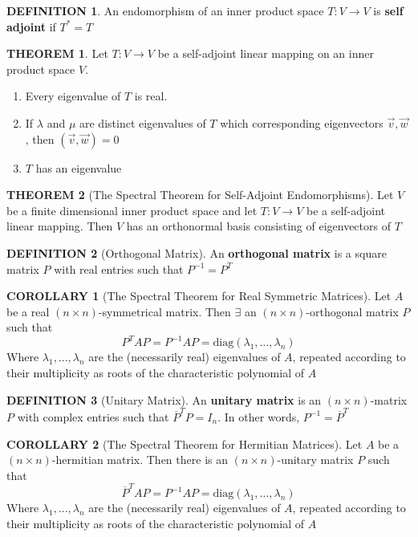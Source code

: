 \documentclass[10pt]{article}
\theoremstyle{definition}
\newtheorem{definition}{DEFINITION}[subsection]
\newtheorem{theorem}{THEOREM}[subsection]
\newtheorem{corollary}{COROLLARY}[subsection]
\begin{document}
\begin{definition}
    An endomorphism of an inner product space $T:V \rightarrow V$ is \textbf{self adjoint} if $T^* = T$
\end{definition}

\begin{theorem}
    Let $T:V \rightarrow V$ be a self-adjoint linear mapping on an inner product space $V$.
    \begin{enumerate}
        \item Every eigenvalue of $T$ is real.
        \item If $\lambda$ and $\mu$ are distinct eigenvalues of $T$ which corresponding eigenvectors $\vec{v}, \vec{w}$, then $(\vec{v}, \vec{w}) = 0$
        \item $T$ has an eigenvalue
    \end{enumerate}
\end{theorem}

\begin{theorem}[The Spectral Theorem for Self-Adjoint Endomorphisms]
    Let $V$ be a finite dimensional inner product space and let $T:V \rightarrow V$ be a self-adjoint linear mapping. Then $V$ has an orthonormal basis consisting of eigenvectors of $T$
\end{theorem}

\begin{definition}[Orthogonal Matrix]
    An \textbf{orthogonal matrix} is a square matrix $P$ with real entries such that $P^{-1} = P^T$ 
\end{definition}

\begin{corollary}[The Spectral Theorem for Real Symmetric Matrices]
    Let $A$ be a real $(n \times n)$-symmetrical matrix. Then $\exists$ an $(n \times n)$-orthogonal matrix $P$ such that
    $$P^TAP = P^{-1}AP = \text{diag}(\lambda_1,..., \lambda_n)$$
    Where $\lambda_1, ..., \lambda_n$ are the (necessarily real) eigenvalues of $A$, repeated according to their multiplicity as roots of the characteristic polynomial of $A$
\end{corollary}

\begin{definition}[Unitary Matrix]
    An \textbf{unitary matrix} is an $(n \times n)$-matrix $P$ with complex entries such that $\overline{P}^TP = I_n$. In other words, $P^{-1} = \overline{P}^T$ 
\end{definition}

\begin{corollary}[The Spectral Theorem for Hermitian Matrices]
    Let $A$ be a $(n\times n)$-hermitian matrix. Then there is an $(n \times n)$-unitary matrix $P$ such that
    $$\overline{P}^TAP = P^{-1}AP = \text{diag}(\lambda_1,..., \lambda_n)$$
    Where $\lambda_1, ..., \lambda_n$ are the (necessarily real) eigenvalues of $A$, repeated according to their multiplicity as roots of the characteristic polynomial of $A$
\end{corollary}
\end{document}
